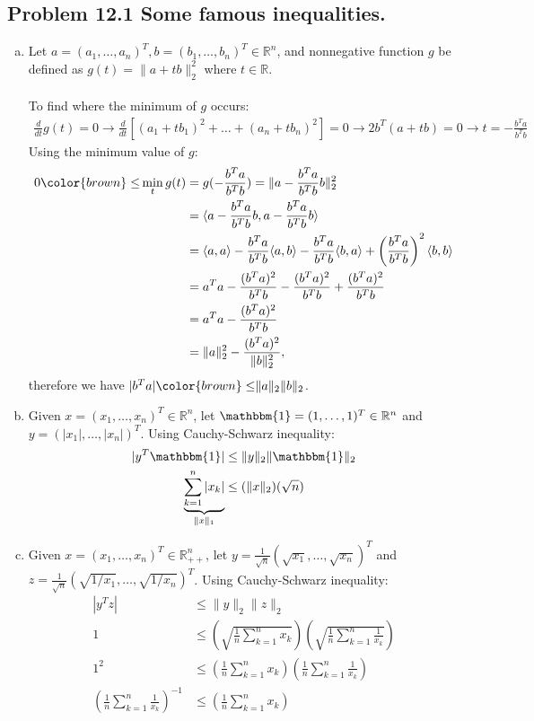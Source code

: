 \documentclass[12pt, letterpaper]{article}
\newcommand{\R}{\mathbb{R}}
\begin{document}
\subsection*{Problem 12.1 \small Some famous inequalities.}
\begin{enumerate}[(a)]
    \item Let $a=(a_1,\dots,a_n)^T, b=(b_1,\dots,b_n)^T\in\R^n$, and nonnegative function $g$ be defined as $g(t)=\|a+tb\|_2^2$ where $t\in\R$.\\\\
    To find where the minimum of $g$ occurs:
    \begin{align*}
        \frac{d}{dt}g(t)=0\rightarrow\frac{d}{dt}[(a_1+tb_1)^2+\dots+(a_n+tb_n)^2]=0\rightarrow2b^T(a+tb)=0\rightarrow t=-\frac{b^T a}{b^T b}
    \end{align*}
    Using the minimum value of $g$:
    \begin{align*}
        0{\color{brown}\leq} \min_t g(t)&=g(-\frac{b^T a}{b^T b})=\|a-\frac{b^T a}{b^T b}b\|_2^2\\
        &=\langle a-\frac{b^T a}{b^T b}b, a-\frac{b^T a}{b^T b}b\rangle\\
        &=\langle a,a\rangle -\frac{b^T a}{b^T b}\langle a,b\rangle -\frac{b^T a}{b^T b} \langle b,a\rangle + \left(\frac{b^T a}{b^T b}\right)^2\langle b,b\rangle\\
        &=a^Ta -\frac{(b^T a)^2}{b^T b} -\frac{(b^T a)^2}{b^T b}  + \frac{(b^T a)^2}{b^T b}\\
        &=a^Ta -\frac{(b^T a)^2}{b^T b}\\
        &=\|a\|^2_2-\frac{(b^T a)^2}{\|b\|^2_2},
    \end{align*}
    therefore we have $|b^Ta|{\color{brown}\leq} \|a\|_2\|b\|_2$.
    \item Given $x=(x_1,\dots,x_n)^T\in\R^n$, let $\mathbbm{1}=(1,\dots,1)^T\in\R^n$ and $y=(|x_1|,\dots, |x_n|)^T$. Using Cauchy-Schwarz inequality:
    \begin{align*}
        |y^T\mathbbm{1}|&\leq\|y\|_2\|\mathbbm{1}\|_2\\
        \underbrace{\sum_{k=1}^n|x_k|}_{\|x\|_1}&\leq(\|x\|_2)(\sqrt{n})
    \end{align*}

    \item Given $x=(x_1,\dots,x_n)^T\in\R^n_{++}$, let $y=\frac{1}{\sqrt{n}}(\sqrt{x_1},\dots,\sqrt{x_n})^T$ and $z=\frac{1}{\sqrt{n}}(\sqrt{1/x_1},\dots,\sqrt{1/x_n})^T$. Using Cauchy-Schwarz inequality:
    \begin{align*}
        |y^Tz|&\leq\|y\|_2\|z\|_2\\
        1&\leq (\sqrt{\frac{1}{n}\sum_{k=1}^nx_k})(\sqrt{\frac{1}{n}\sum_{k=1}^n\frac{1}{x_k}})\\
        1^2&\leq (\frac{1}{n}\sum_{k=1}^nx_k)(\frac{1}{n}\sum_{k=1}^n\frac{1}{x_k})\\
        (\frac{1}{n}\sum_{k=1}^n\frac{1}{x_k})^{-1}&\leq (\frac{1}{n}\sum_{k=1}^nx_k)
    \end{align*}
    
\end{enumerate}
\end{document}
